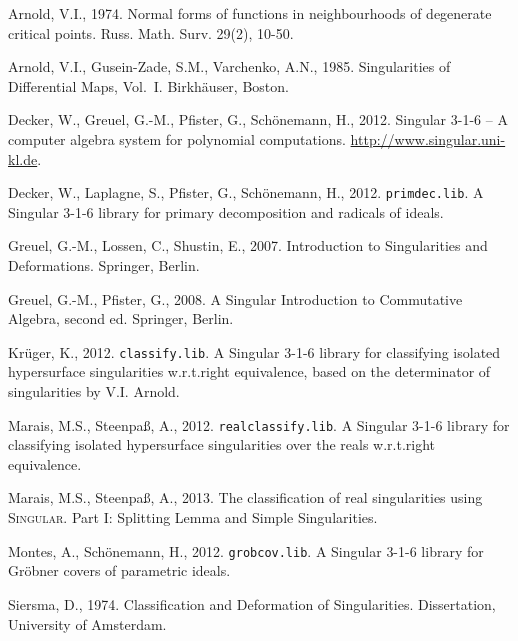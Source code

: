 \documentclass[noend]{amsproc}
\theoremstyle{definition}
\newcommand{\Singular}{\textsc{Singular}}
\begin{document}
\begin{thebibliography}{99}

Arnold, V.I., 1974.
Normal forms of functions in neighbourhoods of degenerate critical points.
Russ. Math. Surv. 29(2), 10-50.

Arnold, V.I., Gusein-Zade, S.M., Varchenko, A.N., 1985.
Singularities of Differential Maps, Vol.~I.
Birkh\"auser, Boston.

Decker, W., Greuel, G.-M., Pfister, G., Sch{\"o}nemann, H., 2012.
{\sc Singular} {3-1-6} -- {A} computer algebra system for polynomial
computations.
\url{http://www.singular.uni-kl.de}.

Decker, W., Laplagne, S., Pfister, G., Sch\"onemann, H., 2012.
{\tt primdec.lib}. {A} {\sc Singular} {3-1-6} library for primary decomposition
and radicals of ideals.

Greuel, G.-M., Lossen, C., Shustin, E., 2007.
Introduction to Singularities and Deformations.
Springer, Berlin.

Greuel, G.-M., Pfister, G., 2008.
A Singular Introduction to Commutative Algebra, second ed.
Springer, Berlin.

Kr\"uger, K., 2012.
{\tt classify.lib}. {A} {\sc Singular} {3-1-6} library for classifying isolated
hypersurface singularities w.r.t.\@ right equivalence, based on the
determinator of singularities by V.I. Arnold.

Marais, M.S., Steenpa\ss, A., 2012.
{\tt realclassify.lib}. {A} {\sc Singular} {3-1-6} library for classifying
isolated hypersurface singularities over the reals w.r.t.\@ right equivalence.

Marais, M.S., Steenpa\ss, A., 2013.
The classification of real singularities using \Singular{}. Part I: Splitting
Lemma and Simple Singularities.

Montes, A., Sch\"onemann, H., 2012.
{\tt grobcov.lib}. {A} {\sc Singular} {3-1-6} library for Gr\"obner covers of
parametric ideals.

Siersma, D., 1974.
Classification and Deformation of Singularities.
Dissertation, University of Amsterdam.

\end{thebibliography}
\end{document}
